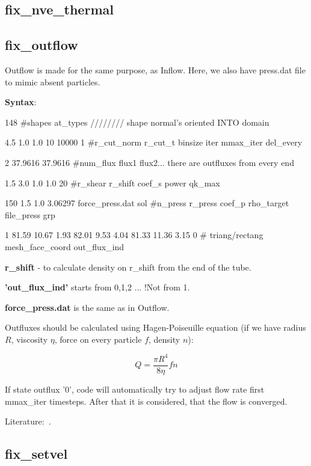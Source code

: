 \documentclass[a4paper,10pt]{scrreprt}
\begin{document}
\subsection{fix\_nve\_thermal}

\subsection{fix\_outflow}

Outflow is made for the same purpose, as Inflow. Here, we also have press.dat file to mimic absent particles.

\textbf{Syntax}:

148 \#shapes at\_types //////// shape normal's oriented INTO domain

4.5 1.0 1.0 10 10000 1 \#r\_cut\_norm r\_cut\_t binsize iter mmax\_iter del\_every

2 37.9616 37.9616 \#num\_flux flux1 flux2... there are outfluxes from every end 

1.5 3.0 1.0 1.0 20 \#r\_shear r\_shift coef\_s power qk\_max

150 1.5 1.0 3.06297 force\_press.dat sol \#n\_press r\_press coef\_p rho\_target file\_press grp

1 81.59 10.67 1.93 82.01 9.53 4.04 81.33 11.36 3.15 0 \# triang/rectang mesh\_face\_coord out\_flux\_ind

\textbf{r\_shift} - to calculate density on r\_shift from the end of the tube.

\textbf{'out\_flux\_ind'} starts from 0,1,2 ... !Not from 1.

\textbf{force\_press.dat} is the same as in Outflow.

Outfluxes should be calculated using Hagen-Poiseuille equation (if we have radius $\textit{R}$, viscosity $\eta$, force on every particle $\textit{f}$, density $\textit{n}$):

\begin{equation}\label{eq:H-P}
Q = \frac{\pi R^{4}}{8 \eta}fn
\end{equation}

If state outflux '0', code will automatically try to adjust flow rate  first mmax\_iter timesteps. After that it is considered, that the flow is converged.

Literature:~\cite{Lei20113765}.

\subsection{fix\_setvel}
\end{document}
